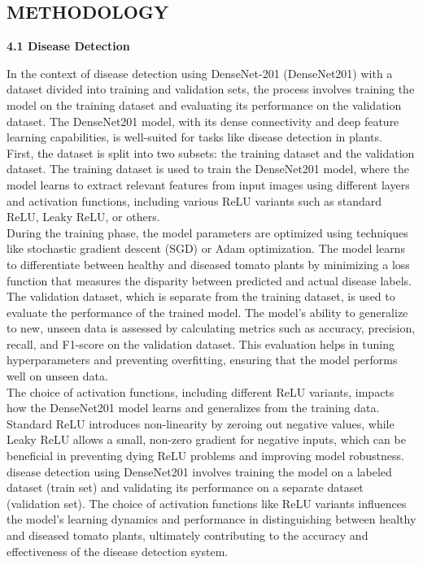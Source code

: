 \documentclass[12pt, English]{article}
\newcommand\tab[1][1cm]{\hspace*{#1}}
\begin{document}
\begin{normalsize}
\begin{center}
\section{ \Large  METHODOLOGY}
\end{center}

\begin{large}
\textbf{4.1 Disease Detection }\\
\end{large}
\text 
\tab  
In the context of disease detection using DenseNet-201 (DenseNet201) with a dataset divided into training and validation sets, the process involves training the model on the training dataset and evaluating its performance on the validation dataset. The DenseNet201 model, with its dense connectivity and deep feature learning capabilities, is well-suited for tasks like disease detection in plants. \\
First, the dataset is split into two subsets: the training dataset and the validation dataset. The training dataset is used to train the DenseNet201 model, where the model learns to extract relevant features from input images using different layers and activation functions, including various ReLU variants such as standard ReLU, Leaky ReLU, or others.\\
During the training phase, the model parameters are optimized using techniques like stochastic gradient descent (SGD) or Adam optimization. The model learns to differentiate between healthy and diseased tomato plants by minimizing a loss function that measures the disparity between predicted and actual disease labels.\\
The validation dataset, which is separate from the training dataset, is used to evaluate the performance of the trained model. The model's ability to generalize to new, unseen data is assessed by calculating metrics such as accuracy, precision, recall, and F1-score on the validation dataset. This evaluation helps in tuning hyperparameters and preventing overfitting, ensuring that the model performs well on unseen data.\\
The choice of activation functions, including different ReLU variants, impacts how the DenseNet201 model learns and generalizes from the training data. Standard ReLU introduces non-linearity by zeroing out negative values, while Leaky ReLU allows a small, non-zero gradient for negative inputs, which can be beneficial in preventing dying ReLU problems and improving model robustness.\\
disease detection using DenseNet201 involves training the model on a labeled dataset (train set) and validating its performance on a separate dataset (validation set). The choice of activation functions like ReLU variants influences the model's learning dynamics and performance in distinguishing between healthy and diseased tomato plants, ultimately contributing to the accuracy and effectiveness of the disease detection system.\\


\end{normalsize}
\end{document}
